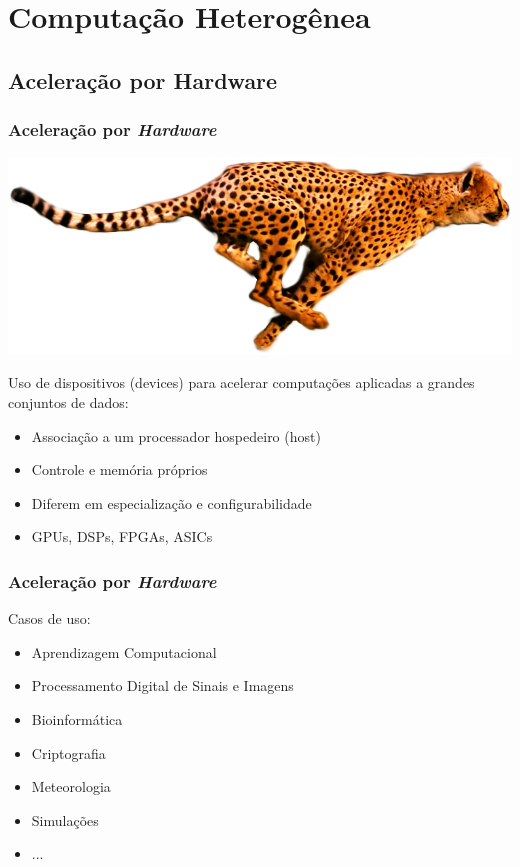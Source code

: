 \documentclass[10pt, compress]{beamer}
\begin{document}
\section{Computação Heterogênea}

\subsection{Aceleração por Hardware}

\begin{frame}
    \frametitle{Aceleração por \textit{Hardware}}
    \begin{center}
        \includegraphics[width=.6\textwidth]{accelerate}
    \end{center}

    Uso de \alert{dispositivos} (devices) para acelerar computações aplicadas a
    grandes conjuntos de dados:
    \pause
    \begin{itemize}
        \item Associação a um processador \alert{hospedeiro} (host)
            \pause
        \item Controle e memória próprios
            \pause
        \item Diferem em especialização e configurabilidade
            \pause
        \item \alert{GPUs}, DSPs, FPGAs, ASICs
    \end{itemize}
\end{frame}

\begin{frame}
    \frametitle{Aceleração por \textit{Hardware}}
    Casos de uso:
    \begin{itemize}
        \item Aprendizagem Computacional
        \item Processamento Digital de Sinais e Imagens
        \item Bioinformática
        \item Criptografia
        \item Meteorologia
        \item Simulações
        \item ...
    \end{itemize}
\end{frame}
\end{document}
